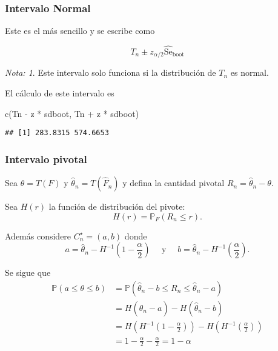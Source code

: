\documentclass[
  12pt,
]{book}
\newenvironment{Shaded}{\begin{snugshade}}{\end{snugshade}}
\newcommand{\FunctionTok}[1]{\textcolor[rgb]{0.00,0.00,0.00}{#1}}
\newcommand{\NormalTok}[1]{#1}
\newcommand{\SpecialCharTok}[1]{\textcolor[rgb]{0.00,0.00,0.00}{#1}}
\theoremstyle{definition}
\theoremstyle{definition}
\theoremstyle{definition}
\theoremstyle{definition}
\theoremstyle{remark}
\newtheorem*{remark}{Nota: }
\begin{document}
\hypertarget{intervalo-normal}{%
\subsubsection{Intervalo Normal}\label{intervalo-normal}}

Este es el más sencillo y se escribe como

\begin{equation}
T_{n} \pm z_{\alpha / 2} \widehat{\mathrm{Se}}_{\mathrm{boot}}
\end{equation}

\begin{remark}
Este intervalo solo funciona si la distribución de \(T_{n}\) es normal.
\end{remark}

El cálculo de este intervalo es

\begin{Shaded}
\begin{Highlighting}[]
\FunctionTok{c}\NormalTok{(Tn }\SpecialCharTok{{-}}\NormalTok{ z }\SpecialCharTok{*}\NormalTok{ sdboot, Tn }\SpecialCharTok{+}\NormalTok{ z }\SpecialCharTok{*}\NormalTok{ sdboot)}
\end{Highlighting}
\end{Shaded}

\begin{verbatim}
## [1] 283.8315 574.6653
\end{verbatim}

\hypertarget{intervalo-pivotal}{%
\subsubsection{Intervalo pivotal}\label{intervalo-pivotal}}

Sea \(\theta=T(F)\) y \(\widehat{\theta}_{n}=T\left(\widehat{F}_{n}\right)\) y defina la cantidad pivotal \(R_{n}=\widehat{\theta}_{n}-\theta .\)

Sea \(H(r)\) la función de distribución del pivote:
\[
H(r)=\mathbb{P}_{F}\left(R_{n} \leq r\right).
\]

Además considere \(C_{n}^{\star}=(a, b)\) donde
\[
a=\widehat{\theta}_{n}-H^{-1}\left(1-\frac{\alpha}{2}\right) \quad \text { y } \quad b=\widehat{\theta}_{n}-H^{-1}\left(\frac{\alpha}{2}\right).
\]

Se sigue que
\begin{align*}
\mathbb{P}(a \leq \theta \leq b)
&=\mathbb{P}\left(\widehat{\theta}_{n}-b \leq R_{n} \leq \widehat{\theta}_{n}-a\right) \\
&=H\left(\widehat{\theta}_{n}-a\right)-H\left(\widehat{\theta}_{n}-b\right) \\
&=H\left(H^{-1}\left(1-\frac{\alpha}{2}\right)\right)-H\left(H^{-1}\left(\frac{\alpha}{2}\right)\right) \\
&=1-\frac{\alpha}{2}-\frac{\alpha}{2}=1-\alpha
\end{align*}
\end{document}
